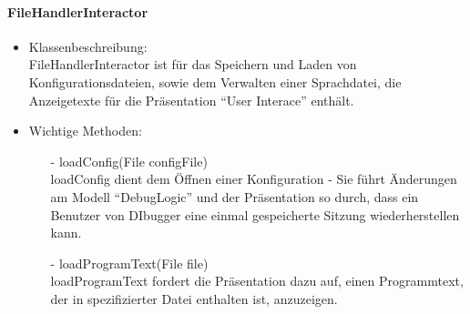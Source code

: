 \documentclass[parskip=full]{scrartcl}
\begin{document}
    \paragraph{FileHandlerInteractor}
        \begin{itemize}
            \item Klassenbeschreibung:\\
                FileHandlerInteractor ist für das Speichern und Laden von Konfigurationsdateien,
                sowie dem Verwalten einer Sprachdatei, die Anzeigetexte für die Präsentation 
                \enquote{User Interace} enthält.
            \item Wichtige Methoden:\\
                \begin{itemize}
                    \item[-] loadConfig(File configFile)\\
                        loadConfig dient dem Öffnen einer Konfiguration - Sie führt Änderungen
                        am Modell \enquote{DebugLogic} und der Präsentation so durch, dass
                        ein Benutzer von DIbugger eine einmal gespeicherte Sitzung
                        wiederherstellen kann.\\

                    \item[-] loadProgramText(File file)\\
                        loadProgramText fordert die Präsentation dazu auf, einen Programmtext,
                        der in spezifizierter Datei enthalten ist, anzuzeigen.
                \end{itemize}
        \end{itemize}
\end{document}
